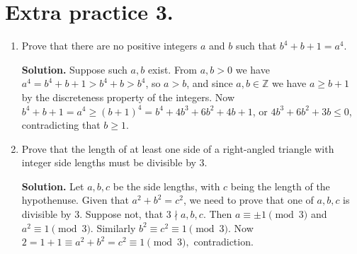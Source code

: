 \documentclass[11pt]{article}
\begin{document}
\section {Extra practice 3.}
\begin{enumerate}
\item Prove that there are no positive integers $a$ and $b$ such that $b^4+b+1=a^4.$

\textbf{Solution.} Suppose such $a,b$ exist. From $a,b>0$ we have $a^4=b^4+b+1>b^4+b>b^4$, so $a>b$, and since $a,b\in\mathbb{Z}$ we have $a\ge b+1$ by the discreteness property of the integers. Now $b^4+b+1=a^4\ge (b+1)^4=b^4+4b^3+6b^2+4b+1$, or $4b^3+6b^2+3b\le 0$, contradicting that $b\ge 1$.

\item Prove that the length of at least one side of a right-angled triangle with integer side lengths must be divisible by 3.

\textbf{Solution.} Let $a,b,c$ be the side lengths, with $c$ being the length of the hypothenuse. Given that $a^2+b^2=c^2$, we need to prove that one of $a,b,c$ is divisible by 3. Suppose not, that $3\nmid a, b, c$. Then $a\equiv \pm 1\pmod {3}$ and $a^2\equiv 1\pmod {3}$. Similarly $b^2\equiv c^2\equiv 1\pmod {3}$. Now $2=1+1\equiv a^2+b^2=c^2\equiv 1\pmod {3},$ contradiction.
\end{enumerate}
\end{document}
